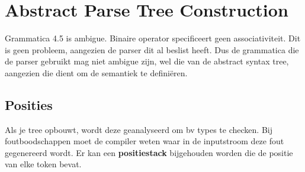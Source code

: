 \section{Abstract Parse Tree Construction}

Grammatica 4.5 is ambigue. Binaire operator specificeert geen associativiteit. Dit is geen probleem, aangezien de parser dit al beslist heeft. Dus de grammatica die de parser gebruikt mag niet ambigue zijn, wel die van de abstract syntax tree, aangezien die dient om de semantiek te definiëren.
\subsection{Posities}
Als je tree opbouwt, wordt deze geanalyseerd om bv types te checken. Bij foutboodschappen moet de compiler weten waar in de inputstroom deze fout gegenereerd wordt. Er kan een \textbf{positiestack} bijgehouden worden die de positie van elke token bevat.